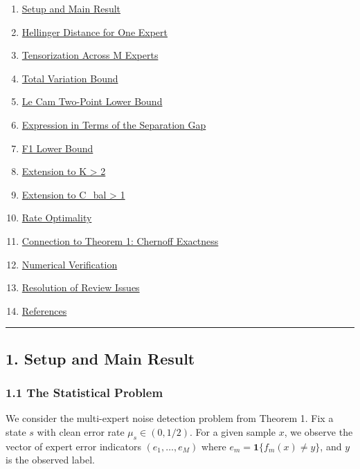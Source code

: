 \documentclass[
  12pt,
]{article}
\providecommand{\tightlist}{%
  \setlength{\itemsep}{0pt}\setlength{\parskip}{0pt}}
\begin{document}
\begin{enumerate}
\def\labelenumi{\arabic{enumi}.}
\tightlist
\item
  \hyperref[1-setup-and-main-result]{Setup and Main Result}
\item
  \hyperref[2-hellinger-distance-for-one-expert]{Hellinger Distance for
  One Expert}
\item
  \hyperref[3-tensorization-across-m-experts]{Tensorization Across M
  Experts}
\item
  \hyperref[4-total-variation-bound]{Total Variation Bound}
\item
  \hyperref[5-le-cam-two-point-lower-bound]{Le Cam Two-Point Lower
  Bound}
\item
  \hyperref[6-expression-in-terms-of-the-separation-gap]{Expression in
  Terms of the Separation Gap}
\item
  \hyperref[7-f1-lower-bound]{F1 Lower Bound}
\item
  \hyperref[8-extension-to-k--2]{Extension to K \textgreater{} 2}
\item
  \hyperref[9-extension-to-cbal--1]{Extension to C\_bal \textgreater{}
  1}
\item
  \hyperref[10-rate-optimality]{Rate Optimality}
\item
  \hyperref[11-connection-to-theorem-1-chernoff-exactness]{Connection to
  Theorem 1: Chernoff Exactness}
\item
  \hyperref[12-numerical-verification]{Numerical Verification}
\item
  \hyperref[13-resolution-of-review-issues]{Resolution of Review Issues}
\item
  \hyperref[14-references]{References}
\end{enumerate}

\begin{center}\rule{0.5\linewidth}{0.5pt}\end{center}

\subsection{1. Setup and Main Result}\label{setup-and-main-result}

\subsubsection{1.1 The Statistical
Problem}\label{the-statistical-problem}

We consider the multi-expert noise detection problem from Theorem 1. Fix
a state \(s\) with clean error rate \(\mu_s \in (0, 1/2)\). For a given
sample \(x\), we observe the vector of expert error indicators
\((e_1, \dots, e_M)\) where \(e_m = \mathbf{1}\{f_m(x) \neq y\}\), and
\(y\) is the observed label.
\end{document}
